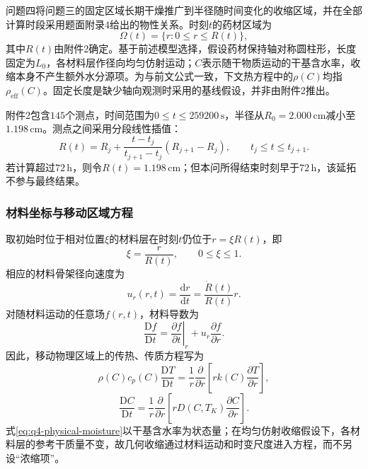 \documentclass[withoutpreface,bwprint]{cumcmthesis}
\begin{document}
问题四将问题三的固定区域长期干燥推广到半径随时间变化的收缩区域，并在全部计算时段采用题面附录4给出的物性关系。时刻$t$的药材区域为
\begin{equation}
\Omega(t)=\{r:0\le r\le R(t)\},
\label{eq:q4-moving-domain}
\end{equation}
其中$R(t)$由附件2确定。基于前述模型选择，假设药材保持轴对称圆柱形，长度固定为$L_0$，各材料层作径向均匀仿射运动；$C$表示随干物质运动的干基含水率，收缩本身不产生额外水分源项。为与前文公式一致，下文热方程中的$\rho(C)$均指$\rho_{\mathrm{eff}}(C)$。固定长度是缺少轴向观测时采用的基线假设，并非由附件2推出。

附件2包含$145$个测点，时间范围为$0\le t\le259200\,\mathrm s$，半径从$R_0=2.000\,\mathrm{cm}$减小至$1.198\,\mathrm{cm}$。测点之间采用分段线性插值：
\begin{equation}
R(t)
=R_j+
\frac{t-t_j}{t_{j+1}-t_j}
\left(R_{j+1}-R_j\right),
\qquad t_j\le t\le t_{j+1}.
\label{eq:q4-radius-interpolation}
\end{equation}
若计算超过$72\,\mathrm h$，则令$R(t)=1.198\,\mathrm{cm}$；但本问所得结束时刻早于$72\,\mathrm h$，该延拓不参与最终结果。

\subsubsection{材料坐标与移动区域方程}

取初始时位于相对位置$\xi$的材料层在时刻$t$仍位于$r=\xi R(t)$，即
\begin{equation}
\boxed{
\xi=\frac{r}{R(t)},
\qquad 0\le\xi\le1.
}
\label{eq:q4-material-coordinate}
\end{equation}
相应的材料骨架径向速度为
\begin{equation}
u_r(r,t)
=\frac{\mathrm dr}{\mathrm dt}
=\frac{\dot R(t)}{R(t)}r.
\label{eq:q4-solid-velocity}
\end{equation}
对随材料运动的任意场$f(r,t)$，材料导数为
\begin{equation}
\frac{\mathrm Df}{\mathrm Dt}
=\left.\frac{\partial f}{\partial t}\right|_r
+u_r\frac{\partial f}{\partial r}.
\label{eq:q4-material-derivative}
\end{equation}
因此，移动物理区域上的传热、传质方程写为
\begin{equation}
\rho(C)c_p(C)\frac{\mathrm DT}{\mathrm Dt}
=\frac{1}{r}\frac{\partial}{\partial r}
\left[rk(C)\frac{\partial T}{\partial r}\right],
\label{eq:q4-physical-heat}
\end{equation}
\begin{equation}
\frac{\mathrm DC}{\mathrm Dt}
=\frac{1}{r}\frac{\partial}{\partial r}
\left[rD(C,T_K)\frac{\partial C}{\partial r}\right].
\label{eq:q4-physical-moisture}
\end{equation}
式\eqref{eq:q4-physical-moisture}以干基含水率为状态量；在均匀仿射收缩假设下，各材料层的参考干质量不变，故几何收缩通过材料运动和时变尺度进入方程，而不另设“浓缩项”。
\end{document}
